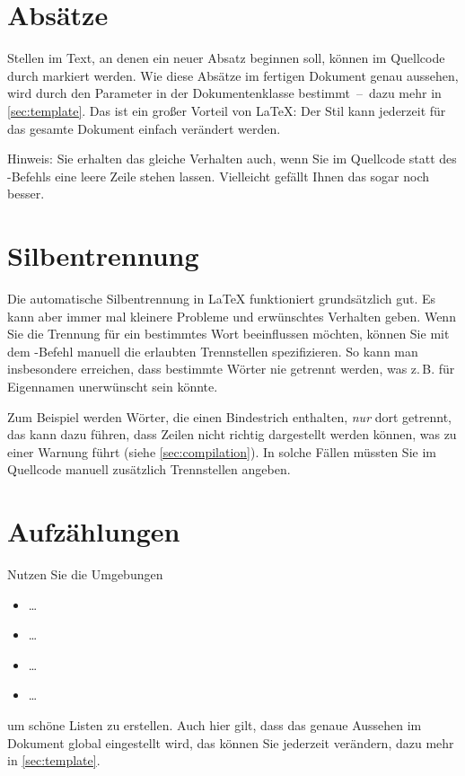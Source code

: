 \section{Absätze}
Stellen im Text, an denen ein neuer Absatz beginnen soll, können im Quellcode durch  markiert werden. Wie diese Absätze im fertigen Dokument genau aussehen, wird durch den Parameter  in der Dokumentenklasse bestimmt~--~dazu mehr in \cref{sec:template}. Das ist ein großer Vorteil von \LaTeX{}: Der Stil kann jederzeit für das gesamte Dokument einfach verändert werden.
\par
Hinweis: Sie erhalten das gleiche Verhalten auch, wenn Sie im Quellcode statt des -Befehls eine leere Zeile stehen lassen. Vielleicht gefällt Ihnen das sogar noch besser.
%
%
\section{Silbentrennung}
\label{sec:hyphenation}
Die automatische Silbentrennung in \LaTeX{} funktioniert grundsätzlich gut. Es kann aber immer mal kleinere Probleme und erwünschtes Verhalten geben. Wenn Sie die Trennung für ein bestimmtes Wort beeinflussen möchten, können Sie mit dem -Befehl manuell die erlaubten Trennstellen spezifizieren. So kann man insbesondere erreichen, dass bestimmte Wörter nie getrennt werden, was z.\,B. für Eigennamen unerwünscht sein könnte.
\par
Zum Beispiel werden Wörter, die einen Bindestrich enthalten, \emph{nur} dort getrennt, das kann dazu führen, dass Zeilen nicht richtig dargestellt werden können, was zu einer Warnung führt (siehe \cref{sec:compilation}). In solche Fällen müssten Sie im Quellcode manuell zusätzlich Trennstellen angeben.
%
%
\section{Aufzählungen}
Nutzen Sie die Umgebungen
%
\begin{itemize}
 \item {} \ldots {}
 \item {} \ldots {}
 \item {} \ldots {}
 \item {} \ldots {}
\end{itemize}
%
um schöne Listen zu erstellen. Auch hier gilt, dass das genaue Aussehen im Dokument global eingestellt wird, das können Sie jederzeit verändern, dazu mehr in \cref{sec:template}.
%
%
